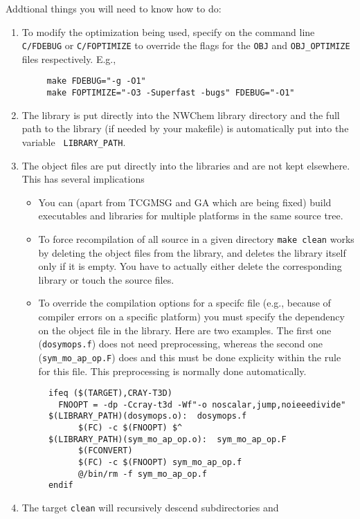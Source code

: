 Addtional things you will need to know how to do:
\begin{enumerate}
\item  To modify the optimization being used, specify on the command
  line {\tt C/FDEBUG} or {\tt C/FOPTIMIZE} to override the flags for the 
  {\tt OBJ} and {\tt OBJ\_OPTIMIZE} files respectively.  E.g.,
\begin{verbatim}
     make FDEBUG="-g -O1"
     make FOPTIMIZE="-O3 -Superfast -bugs" FDEBUG="-O1"
\end{verbatim}
\item  The library is put directly into the NWChem library
  directory and the full path to the library (if needed by your
  makefile) is automatically put into the variable {\tt
    LIBRARY\_PATH}.
\item The object files are put directly into the libraries and are
  not kept elsewhere.  This has several implications
  \begin{itemize}
  \item You can (apart from TCGMSG and GA which are being fixed) build
    executables and libraries for multiple platforms in the same
    source tree.
  \item To force recompilation of all source in a given directory 
    \verb+make clean+  works by deleting the object files from
    the library, and deletes the library itself only if it is empty.
    You have to
    actually either delete the corresponding library or touch the
    source files.
  \item To override the compilation options for a specifc file (e.g.,
    because of compiler errors on a specific platform) you must
    specify the dependency on the object file in the library.  Here
    are two examples.  The first one (\verb+dosymops.f+) does not need
    preprocessing, whereas the second one (\verb+sym_mo_ap_op.F+) does
    and this must be done explicity within the rule for this file.
    This preprocessing is normally done automatically.
\begin{verbatim}
  ifeq ($(TARGET),CRAY-T3D)
    FNOOPT = -dp -Ccray-t3d -Wf"-o noscalar,jump,noieeedivide"
  $(LIBRARY_PATH)(dosymops.o):  dosymops.f
        $(FC) -c $(FNOOPT) $^
  $(LIBRARY_PATH)(sym_mo_ap_op.o):  sym_mo_ap_op.F
        $(FCONVERT)
        $(FC) -c $(FNOOPT) sym_mo_ap_op.f
        @/bin/rm -f sym_mo_ap_op.f
  endif
\end{verbatim}
  \end{itemize}
\item The target {\tt clean} will recursively descend subdirectories and

\end{enumerate}
